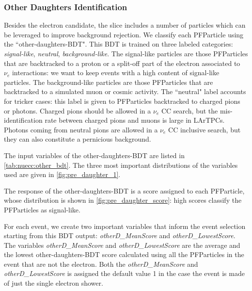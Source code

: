 \subsubsection{Other Daughters Identification}
Besides the electron candidate, the slice includes a number of particles which can be leveraged to improve background rejection. We classify each PFParticle using the ``other-daughters-BDT". This BDT is trained on three labeled categories: \emph{signal-like}, \emph{neutral}, \emph{background-like}. The signal-like particles are those PFParticles that are backtracked to a proton or a split-off part of the electron associated to $\nu_e$ interactions: we want to keep events with a high content of signal-like particles. The background-like particles are those PFParticles that are backtracked to a simulated muon or cosmic activity.
The ``neutral" label accounts for tricker cases: this label is given to PFParticles backtracked to charged pions or photons. Charged pions should be allowed in a $\nu_e$ CC search, but the mis-identification rate between charged pions and muons is large in LArTPCs. Photons coming from neutral pions are allowed in a  $\nu_e$ CC inclusive search, but they can also constitute a pernicious background.

The input variables of the other-daughters-BDT are listed in \cref{tab:nuecc:other_bdt}.
The three most important distributions of the variables used are given in \cref{fig:pre_daughter_1}.  


The response of the other-daughters-BDT is a score assigned to each PFParticle, whose distribution is shown in \cref{fig:pre_daughter_score}: high scores classify the PFParticles as signal-like. 

For each event, we create two important variables that inform the event selection starting from this BDT output:  \emph{otherD\_MeanScore} and \emph{otherD\_LowestScore}.  The variables \emph{otherD\_MeanScore} and   \emph{otherD\_LowestScore} are the average and the lowest other-daughters-BDT score calculated using all the PFParticles in the event that are not the electron. Both the  \emph{otherD\_MeanScore} and  \emph{otherD\_LowestScore}  is assigned the default value 1 in the case the event is made of just the single electron shower.


